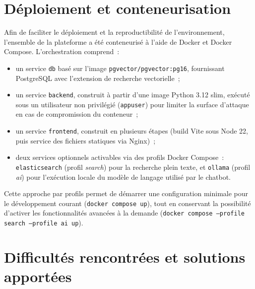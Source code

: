 \documentclass[11pt,a4paper]{report}
\begin{document}
\chapter{Déploiement et conteneurisation}

Afin de faciliter le déploiement et la reproductibilité de l'environnement, l'ensemble de la plateforme a
été conteneurisé à l'aide de Docker et Docker Compose. L'orchestration comprend~:

\begin{itemize}
  \item un service \texttt{db} basé sur l'image \texttt{pgvector/pgvector:pg16}, fournissant PostgreSQL avec
    l'extension de recherche vectorielle~;
  \item un service \texttt{backend}, construit à partir d'une image Python 3.12 slim, exécuté sous un
    utilisateur non privilégié (\texttt{appuser}) pour limiter la surface d'attaque en cas de compromission
    du conteneur~;
  \item un service \texttt{frontend}, construit en plusieurs étapes (build Vite sous Node 22, puis service
    des fichiers statiques via Nginx)~;
  \item deux services optionnels activables via des profils Docker Compose~: \texttt{elasticsearch} (profil
    \emph{search}) pour la recherche plein texte, et \texttt{ollama} (profil \emph{ai}) pour l'exécution
    locale du modèle de langage utilisé par le chatbot.
\end{itemize}

Cette approche par profils permet de démarrer une configuration minimale pour le développement courant
(\texttt{docker compose up}), tout en conservant la possibilité d'activer les fonctionnalités avancées à la
demande (\texttt{docker compose --profile search --profile ai up}).

\chapter{Difficultés rencontrées et solutions apportées}
\end{document}
